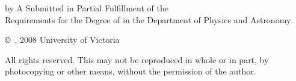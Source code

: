 \pagebreak
{
	\centering
	\thesistitle
	\tpbreak
	by
	\tpbreak
	\nameanddegrees
	\tpbreak
	A \PhDorMas Submitted in Partial Fulfillment of the \\
	Requirements for the Degree of
	\tpbreak
	\PhDorMaster
	\tpbreak
	in the Department of Physics and Astronomy\\
	\vfill
	\begin{center}
		\copyright\ \yourname, 2008 \linebreak
		\phantom{\copyright} University of Victoria
	\end{center}

	All rights reserved. This \PhDorMas may not be reproduced in whole or in part, by \\
	\hfill photocopying or other means, without the permission of the author. 
	\hfill
}
\pagebreak
